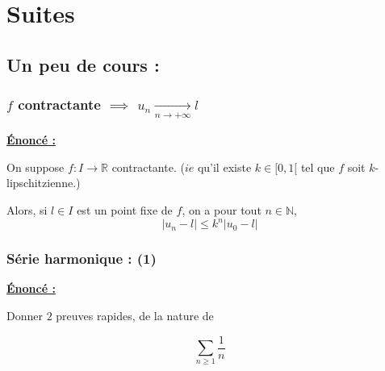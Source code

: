 \newpage
\section{Suites}
\subsection{Un peu de cours : }
\subsubsection{$f$ contractante $\implies$ $u_n \xrightarrow[n \to +\infty]{} l $ }

\textbf{\underline{Énoncé :}} 

On suppose $f:I\rightarrow\mathbb{R}$ contractante. 
($\textit{ie}$ qu'il existe $k \in [0,1[$ tel que 
$f$ soit $k$-lipschitzienne.)  

Alors, si $l \in I$ est un point fixe de $f$, on a 
pour tout $n \in \mathbb{N}$, $$ |u_n-l| \leq k^n |u_0 - l|$$
 
\subsubsection{Série harmonique : (1)}

\textbf{\underline{Énoncé :}} 

Donner $2$ preuves rapides, de la nature de 

$$
\sum_{n \geq 1} \frac{1}{n} 
$$